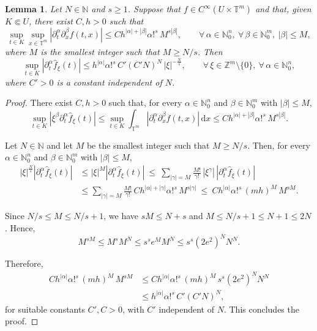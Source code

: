 \documentclass[11pt,reqno]{amsart}
\numberwithin{equation}{section}
\newtheorem{lemma}[theorem]{Lemma}
\begin{document}
\begin{lemma}\label{lemma_fourier_aux_r}
	Let \(N\in\mathbb{N}\) and \(s\geq 1\).
	Suppose that \(f\in C^\infty(U\times\mathbb{T}^m)\) and that, given \(K\Subset U\), there exist \(C,h>0\) such that
	\[
	\sup_{t\in K}\sup_{x\in\mathbb{T}^m}|\partial_t^\alpha\partial_x^\beta f(t,x)|
	\leq
	Ch^{|\alpha|+|\beta|}\alpha!^s\, M^{s|\beta|},\qquad \forall\,\alpha\in\mathbb{N}_0^n,\ \forall\,\beta\in\mathbb{N}_0^m,\ |\beta|\leq M,
	\]
	where \(M\) is the smallest integer such that \(M\geq N/s\). Then
	\[
	\sup_{t\in K}|\partial_t^\alpha\widehat{f}_\xi(t)|
	\leq
	h^{|\alpha|}\alpha!^s\, C'(C'N)^N\,|\xi|^{-\frac{N}{s}},\qquad \forall\,\xi\in\mathbb{Z}^m\setminus\{0\},\  \forall\,\alpha\in\mathbb{N}_0^n,
	\]
	where \(C'>0\) is a constant independent of \(N\).
\end{lemma}

\begin{proof}
	There exist \(C,h>0\) such that, for every \(\alpha\in\mathbb{N}_0^n\) and \(\beta\in\mathbb{N}_0^m\) with \(|\beta|\leq M\),
	\[
	\sup_{t\in K}|\xi^\beta\partial_t^\alpha\widehat{f}_\xi(t)|
	\leq
	\sup_{t\in K}\int_{\mathbb{T}^m}|\partial_t^\alpha\partial_x^\beta f(t,x)|\,\mathrm{d}x
	\leq
	Ch^{|\alpha|+|\beta|}\alpha!^s\, M^{s|\beta|}.
	\]
	
	Let \(N\in\mathbb{N}\) and let \(M\) be the smallest integer such that \(M\geq N/s\).
	Then, for every \(\alpha\in\mathbb{N}_0^n\) and \(\beta\in\mathbb{N}_0^m\) with \(|\beta|\leq M\),
	\begin{align*}
		|\xi|^{\frac{N}{s}}|\partial_t^\alpha\widehat{f}_\xi(t)|
		&\leq
		|\xi|^M|\partial_t^\alpha \widehat{f}_\xi(t)|\ \leq\
		\sum_{|\gamma|=M}\frac{M!}{\gamma!}\,|\xi^\gamma|\,|\partial_t^\alpha\widehat{f}_\xi(t)|\\
		&\leq
		\sum_{|\gamma|=M}\frac{M!}{\gamma!}\, Ch^{|\alpha|+|\gamma|}\alpha!^s\, M^{s|\gamma|}\ \leq\ 
		Ch^{|\alpha|}\alpha!^s\,(mh)^M\, M^{sM}.
	\end{align*}
	
	Since \(N/s\leq M\leq N/s+1\), we have \(sM\leq N+s\) and \(M\leq N/s+1\leq N+1\leq 2N\). Hence,
	\[
	M^{sM}\leq M^{s}M^N \leq s^s e^M M^N \leq s^s(2e^{2})^{N}N^N.
	\]
	
	Therefore,
	\begin{align*}
		Ch^{|\alpha|}\alpha!^s\,(mh)^M\, M^{sM}
		&\leq
		Ch^{|\alpha|}\alpha!^s\,(mh)^M\, s^s(2e^{2})^{N}N^N\\
		&\leq
		h^{|\alpha|}\alpha!^s\, C'(C'N)^N,
	\end{align*}
	for suitable constants \(C',C>0\), with \(C'\) independent of \(N\).
	This concludes the proof.
\end{proof}
\end{document}

